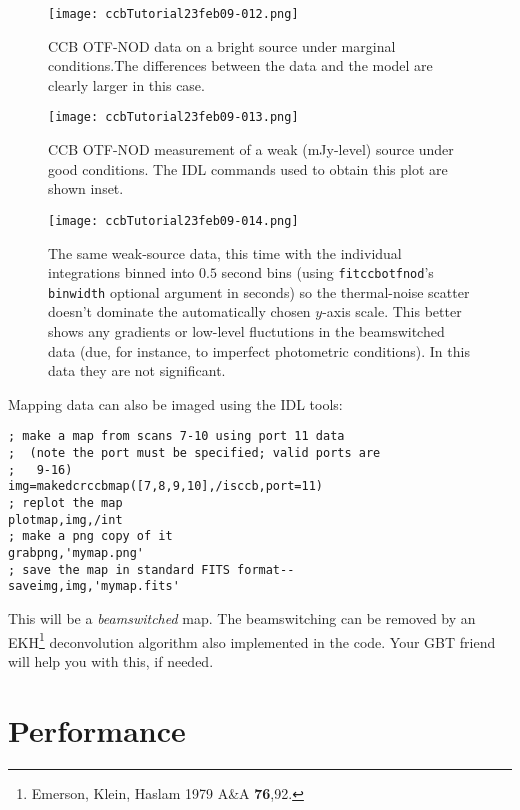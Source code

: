 \begin{figure}
\texttt{[image: ccbTutorial23feb09-012.png]}
\caption[CCB OTF-NOD data on a bright source under marginal conditions]
{CCB OTF-NOD data on a bright source under marginal conditions.The
differences between the data and the model are clearly larger in this case.}
\label{fig:brightpoor}
\end{figure}


\begin{figure}
\texttt{[image: ccbTutorial23feb09-013.png]}
\caption[CCB OTF-NOD measurement of a weak (mJy-level) source under good conditions]
{CCB OTF-NOD measurement of a weak (mJy-level) source under good conditions. The
IDL commands used to obtain this plot are shown inset.}
\label{fig:weak}
\end{figure}


\begin{figure}
\texttt{[image: ccbTutorial23feb09-014.png]}
\caption[The same weak-source data with the individual integrations
binned into $0.5$ second bins]
{The same weak-source data, this time with the individual integrations
binned into $0.5$ second bins (using {\tt fitccbotfnod}'s {\tt
binwidth} optional argument in seconds) so the thermal-noise scatter
doesn't dominate the automatically chosen $y$-axis scale. This better
shows any gradients or low-level fluctutions in the beamswitched data
(due, for instance, to imperfect photometric conditions). In this data
they are not significant.}
\label{fig:weakbinned}
\end{figure}


Mapping data can also be imaged using the IDL tools:
\begin{lstlisting}
; make a map from scans 7-10 using port 11 data 
;  (note the port must be specified; valid ports are
;   9-16)
img=makedcrccbmap([7,8,9,10],/isccb,port=11)
; replot the map
plotmap,img,/int
; make a png copy of it
grabpng,'mymap.png'
; save the map in standard FITS format--
saveimg,img,'mymap.fits'
\end{lstlisting}
This will be a {\it beamswitched} map. The beamswitching can be
removed by an EKH\footnote{Emerson, Klein, Haslam 1979 A\&A {\bf 76},92.} 
deconvolution algorithm also implemented in the
code. Your GBT friend will help you with this, if needed.

\section{Performance}


